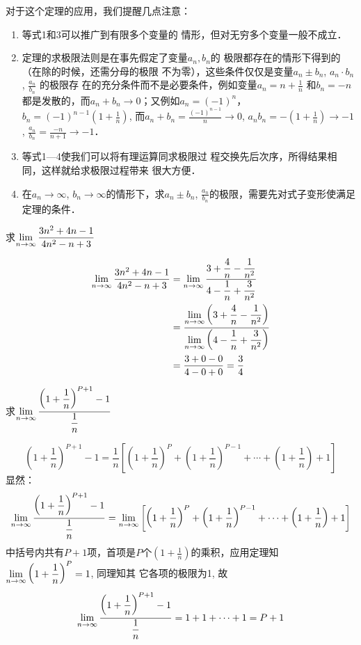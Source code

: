 对于这个定理的应用，我们提醒几点注意：
\begin{enumerate}
    \item 等式1和3可以推广到有限多个变量的
情形，但对无穷多个变量一般不成立．
\item 定理的求极限法则是在事先假定了变量$a_n,b_n$的
极限都存在的情形下得到的（在除的时候，还需分母的极限
不为零），这些条件仅仅是变量$a_n\pm b_n$, $a_n\cdot b_n$, $\frac{a_n}{b_n}$
的极限存
在的充分条件而不是必要条件，例如变量$a_n=n+\frac{1}{n}$
和$b_n=-n$都是发散的，而$a_n+b_n\to 0$；又例如$a_n=(-1)^n$，
$b_n=(-1)^{n-1}\left(1+\frac{1}{n}\right)$, 
而$a_n+b_n=\frac{(-1)^{n-1}}{n}\to 0$, $a_nb_n=-\left(1+\frac{1}{n}\right)\to -1$, $\frac{a_n}{b_n}=\frac{-n}{n+1}\to -1$．
\item 等式1---4使我们可以将有理运算同求极限过
程交换先后次序，所得结果相同，这样就给求极限过程带来
很大方便．
\item 在$a_n\to\infty$, $b_n\to\infty$的情形下，求$a_n\pm b_n$, $\frac{a_n}{b_n}$的极限，需要先对式子变形使满足定理的条件．
\end{enumerate}


\begin{example}
    求$\displaystyle\lim_{n\to\infty}\dfrac{3n^2+4n-1}{4n^2-n+3}$
\end{example}

\begin{solution}
\[\begin{split}
    \displaystyle\lim_{n\to\infty}\dfrac{3n^2+4n-1}{4n^2-n+3}&=\displaystyle\lim_{n\to\infty}\dfrac{3+\dfrac{4}{n}-\dfrac{1}{n^2}}{4-\dfrac{1}{n}+\dfrac{3}{n^2}}\\
    &=\dfrac{\displaystyle\lim_{n\to\infty}\left(3+\dfrac{4}{n}-\dfrac{1}{n^2}\right)}{\displaystyle\lim_{n\to\infty}\left(4-\dfrac{1}{n}+\dfrac{3}{n^2}\right)}\\
    &=\dfrac{3+0-0}{4-0+0}=\dfrac{3}{4}
\end{split}\]    
\end{solution}

\begin{example}
求$\displaystyle\lim_{n\to\infty}\dfrac{\left(1+\dfrac{1}{n}\right)^{P+1}-1}{\dfrac{1}{n}}$  
\end{example}

\begin{solution}
\[\left(1+\frac{1}{n}\right)^{P+1}-1=\frac{1}{n}\left[\left(1+\frac{1}{n}\right)^{P}+\left(1+\frac{1}{n}\right)^{P-1}+\cdots+\left(1+\frac{1}{n}\right)+1\right]\]
    显然：
\[    \displaystyle\lim_{n\to\infty}\dfrac{\left(1+\dfrac{1}{n}\right)^{P+1}-1}{\dfrac{1}{n}}=\displaystyle\lim_{n\to\infty}\left[\left(1+\dfrac{1}{n}\right)^{P}+\left(1+\dfrac{1}{n}\right)^{P-1}+\cdots+\left(1+\dfrac{1}{n}\right)+1\right]
\]
中括号内共有$P+1$项，首项是$P$个$\left(1+\frac{1}{n}\right)$的乘积，应用定理知$\displaystyle\lim_{n\to\infty} \left(1+\dfrac{1}{n}\right)^{P}=1$, 同理知其
它各项的极限为1, 故
\[    \displaystyle\lim_{n\to\infty}\dfrac{\left(1+\dfrac{1}{n}\right)^{P+1}-1}{\dfrac{1}{n}}=1+1+\cdots+1=P+1
\]
\end{solution}


